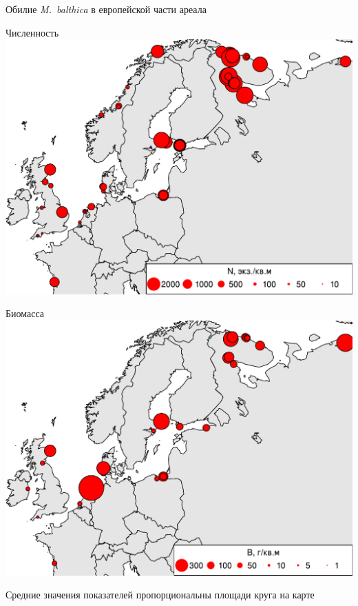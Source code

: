 \documentclass{beamer}
\begin{document}
\begin{frame}{Обилие {\it M.~balthica} в европейской части ареала}
	\begin{minipage}[t]{.49\linewidth}
		\begin{center}
		{\footnotesize Численность}
			\includegraphics[width=\textwidth]{Nmean_ru1.pdf}
		\end{center}
	\end{minipage}
%
	\begin{minipage}[t]{.49\linewidth}
		\begin{center}
		{\footnotesize Биомасса}
			\includegraphics[width=\textwidth]{Bmean_ru1.pdf}
		\end{center}
	\end{minipage}

{\tiny Средние значения показателей пропорциональны площади круга на карте}
\end{frame}
\end{document}
